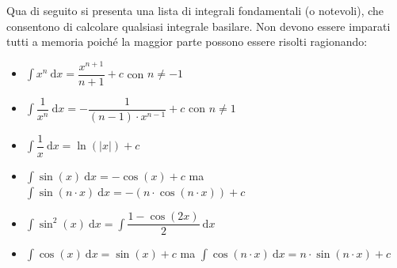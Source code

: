 \documentclass[a4paper]{article}
\begin{document}
	Qua di seguito si presenta una lista di integrali fondamentali (o notevoli), che consentono di calcolare qualsiasi integrale basilare. Non devono essere imparati tutti a memoria poiché la maggior parte possono essere risolti ragionando:
	\begin{itemize}
		\item $\displaystyle\int x^{n} \: \mathrm{d}x = \dfrac{x^{n+1}}{n+1}+c$ \hspace{1em} con $n \ne -1$

		\item $\displaystyle\int \dfrac{1}{x^{n}} \: \mathrm{d}x = - \dfrac{1}{\left(n-1\right) \cdot x^{n-1}} + c$ \hspace{1em} con $n \ne 1$

		\item $\displaystyle\int \dfrac{1}{x} \: \mathrm{d}x = \ln\left(|x|\right) + c$

		\item $\displaystyle\int \sin\left(x\right) \: \mathrm{d}x = -\cos\left(x\right) + c$ \hspace{.5em} ma \hspace{.5em} $\displaystyle\int \sin\left(n \cdot x\right) \: \mathrm{d}x = -\left(n \cdot \cos\left(n \cdot x\right)\right) + c$
		
		\item $\displaystyle\int \sin^{2}\left(x\right) \: \mathrm{d}x = \int\dfrac{1-\cos\left(2x\right)}{2} \:\mathrm{d}x$

		\item $\displaystyle\int \cos\left(x\right) \: \mathrm{d}x = \sin\left(x\right) + c$ \hspace{.5em} ma \hspace{.5em} $\displaystyle\int \cos\left(n \cdot x\right) \: \mathrm{d}x = n \cdot \sin\left(n \cdot x\right) + c$
	\end{itemize}
\end{document}
